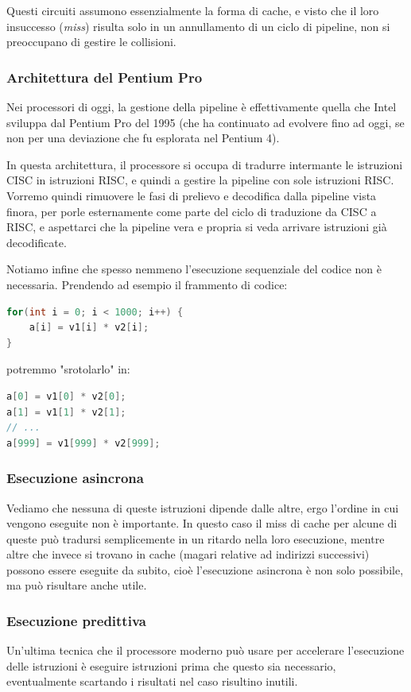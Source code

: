 \documentclass[a4paper,11pt]{article}
\begin{document}
\begin{itemize}
\begin{itemize}
				Questi circuiti assumono essenzialmente la forma di cache, e visto che il loro insuccesso (\textit{miss}) risulta solo in un annullamento di un ciclo di pipeline, non si preoccupano di gestire le collisioni.
		\end{itemize}

\end{itemize}

\subsubsection{Architettura del Pentium Pro}
Nei processori di oggi, la gestione della pipeline è effettivamente quella che Intel sviluppa dal Pentium Pro del 1995 (che ha continuato ad evolvere fino ad oggi, se non per una deviazione che fu esplorata nel Pentium 4).

In questa architettura, il processore si occupa di tradurre intermante le istruzioni CISC in istruzioni RISC, e quindi a gestire la pipeline con sole istruzioni RISC.
Vorremo quindi rimuovere le fasi di prelievo e decodifica dalla pipeline vista finora, per porle esternamente come parte del ciclo di traduzione da CISC a RISC, e aspettarci che la pipeline vera e propria si veda arrivare istruzioni già decodificate. 

\par\medskip

Notiamo infine che spesso nemmeno l'esecuzione sequenziale del codice non è necessaria.
Prendendo ad esempio il frammento di codice:
\begin{lstlisting}[language=C++, style=codestyle]	
for(int i = 0; i < 1000; i++) {
	a[i] = v1[i] * v2[i];
}
\end{lstlisting}
potremmo "srotolarlo" in:
\begin{lstlisting}[language=C++, style=codestyle]	
a[0] = v1[0] * v2[0];
a[1] = v1[1] * v2[1];
// ...
a[999] = v1[999] * v2[999];
\end{lstlisting}

\subsubsection{Esecuzione asincrona}
Vediamo che nessuna di queste istruzioni dipende dalle altre, ergo l'ordine in cui vengono eseguite non è importante.
In questo caso il miss di cache per alcune di queste può tradursi semplicemente in un ritardo nella loro esecuzione, mentre altre che invece si trovano in cache (magari relative ad indirizzi successivi) possono essere eseguite da subito, cioè l'esecuzione asincrona è non solo possibile, ma può risultare anche utile.

\subsubsection{Esecuzione predittiva}
Un'ultima tecnica che il processore moderno può usare per accelerare l'esecuzione delle istruzioni è eseguire istruzioni prima che questo sia necessario, eventualmente scartando i risultati nel caso risultino inutili. 
\end{document}
